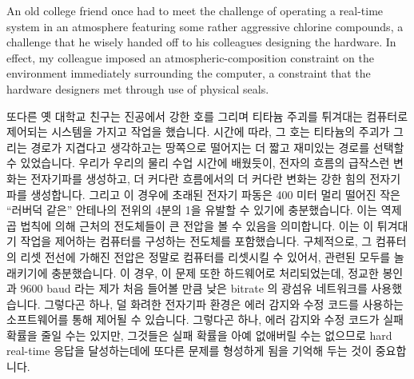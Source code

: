 An old college friend once had to meet the challenge of operating
a real-time system in an atmosphere featuring some rather aggressive
chlorine compounds, a challenge that he wisely handed off to his
colleagues designing the hardware.
In effect, my colleague imposed an atmospheric-composition constraint
on the environment immediately surrounding the computer, a constraint
that the hardware designers met through use of physical seals.
\fi

또다른 옛 대학교 친구는 진공에서 강한 호를 그리며 티타늄 주괴를 튀겨대는
컴퓨터로 제어되는 시스템을 가지고 작업을 했습니다.
시간에 따라, 그 호는 티타늄의 주괴가 그리는 경로가 지겹다고 생각하고는 땅쪽으로
떨어지는 더 짧고 재미있는 경로를 선택할 수 있었습니다.
우리가 우리의 물리 수업 시간에 배웠듯이, 전자의 흐름의 급작스런 변화는
전자기파를 생성하고, 더 커다란 흐름에서의 더 커다란 변화는 강한 힘의 전자기파를
생성합니다.
그리고 이 경우에 초래된 전자기 파동은 400 미터 멀리 떨어진 작은 ``러버덕 같은''
안테나의 전위의 4분의 1을 유발할 수 있기에 충분했습니다.
이는 역제곱 법칙에 의해 근처의 전도체들이 큰 전압을 볼 수 있음을 의미합니다.
이는 이 튀겨대기 작업을 제어하는 컴퓨터를 구성하는 전도체를 포함했습니다.
구체적으로, 그 컴퓨터의 리셋 전선에 가해진 전압은 정말로 컴퓨터를 리셋시킬 수
있어서, 관련된 모두를 놀래키기에 충분했습니다.
이 경우, 이 문제 또한 하드웨어로 처리되었는데, 정교한 봉인과 9600 baud 라는
제가 처음 들어볼 만큼 낮은 bitrate 의 광섬유 네트워크를 사용했습니다.
그렇다곤 하나, 덜 화려한 전자기파 환경은 에러 감지와 수정 코드를 사용하는
소프트웨어를 통해 제어될 수 있습니다.
그렇다곤 하나, 에러 감지와 수정 코드가 실패 확률을 줄일 수는 있지만, 그것들은
실패 확률을 아예 없애버릴 수는 없으므로 hard real-time 응답을 달성하는데에
또다른 문제를 형성하게 됨을 기억해 두는 것이 중요합니다.
\iffalse

